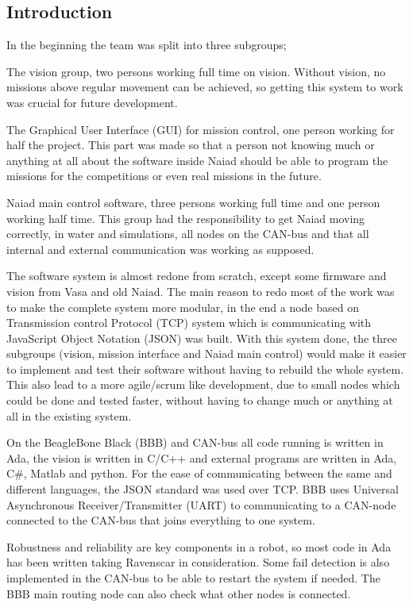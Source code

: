 \subsection{Introduction}
\noindent In the beginning the team was split into three subgroups;

The vision group, two persons working full time on vision. Without vision, no missions above regular movement can be achieved, so getting this system to work was crucial for future development.

The Graphical User Interface (GUI) for mission control, one person working for half the project. This part was made so that a person not knowing much or anything at all about the software inside Naiad should be able to program the missions for the competitions or even real missions in the future.

Naiad main control software, three persons working full time and one person working half time. This group had the responsibility to get Naiad moving correctly, in water and simulations, all nodes on the CAN-bus and that all internal and external communication was working as supposed.

The software system is almost redone from scratch, except some firmware and vision from Vasa and old Naiad. The main reason to redo most of the work was to make the complete system more modular, in the end a node based on Transmission control Protocol (TCP) system which is communicating with JavaScript Object Notation (JSON) \cite{JSON} was built. With this system done, the three subgroups (vision, mission interface and Naiad main control) would make it easier to implement and test their software without having to rebuild the whole system. This also lead to a more agile/scrum like development, due to small nodes which could be done and tested faster, without having to change much or anything at all in the existing system.

On the BeagleBone Black (BBB) \cite{BBB} and CAN-bus all code running is written in Ada, the vision is written in C/C++ and external programs are written in Ada, C\#, Matlab and python. 
For the ease of communicating between the same and different languages, the JSON standard was used over TCP. BBB uses  Universal Asynchronous Receiver/Transmitter (UART) to communicating to a CAN-node connected to the CAN-bus that joins everything to one system.

Robustness and reliability are key components in a robot, so most code in Ada has been written taking Ravenscar \cite{Ravenscar} in consideration. Some fail detection is also implemented in the CAN-bus to be able to restart the system if needed. The BBB main routing node can also check what other nodes is connected.


